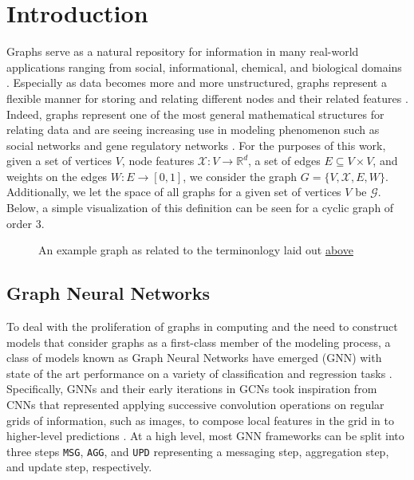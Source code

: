 \section{Introduction}
\label{sec:intro}
Graphs serve as a natural repository for information in many real-world applications ranging from social, informational, chemical, and biological domains \cite{cho_friendship_2011}. Especially as data becomes more and more unstructured, graphs represent a flexible manner for storing and relating different nodes and their related features \cite{washio_state_2003}. Indeed, graphs represent one of the most general mathematical structures for relating data and are seeing increasing use in modeling phenomenon such as social networks and gene regulatory networks \cite{washio_state_2003,petralia_new_2016}. For the purposes of this work, given a set of vertices $V$, node features $\mathcal{X} : V \rightarrow \mathbb{R}^{d}$, a set of edges $E \subseteq V \times V$, and weights on the edges $W : E \rightarrow [0,1]$, we consider the graph $G = \{V, \mathcal{X}, E, W\}$. Additionally, we let the space of all graphs for a given set of vertices $V$ be $\mathcal{G}$. Below, a simple visualization of this definition can be seen for a cyclic graph of order 3.
\begin{figure}[H]
  \centering
  
  \caption{An example graph as related to the terminonlogy laid out \hyperref[sec:intro]{above}}
\end{figure}

\subsection{Graph Neural Networks}
To deal with the proliferation of graphs in computing and the need to construct models that consider graphs as a first-class member of the modeling process, a class of models known as Graph Neural Networks have emerged (GNN) with state of the art performance on a variety of classification and regression tasks \cite{ying_gnnexplainer_2019}. Specifically, GNNs and their early iterations in GCNs took inspiration from CNNs that represented applying successive convolution operations on regular grids of information, such as images, to compose local features in the grid in to higher-level predictions \cite{defferrard_convolutional_2017}. At a high level, most GNN frameworks can be split into three steps \verb|MSG|, \verb|AGG|, and \verb|UPD| representing a messaging step, aggregation step, and update step, respectively.

